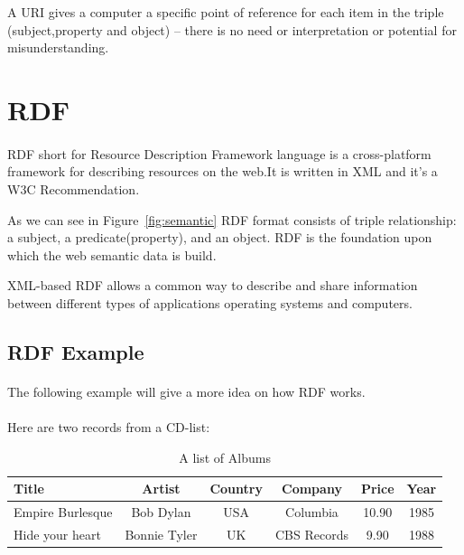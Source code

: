\documentclass[a4paper,11pt]{report}
\begin{document}
A URI gives a computer a specific point of reference for each item in the triple (subject,property and object) -- there is no need or interpretation or potential for misunderstanding.\\

\section{RDF}
\paragraph{}
RDF short for Resource Description Framework language is a  {\color{red}cross-platform framework} for describing resources on the web.It is written in XML and it's a W3C Recommendation.

As we can see in  Figure~\ref{fig:semantic}  RDF format consists of triple relationship: a subject, a predicate(property), and an object. RDF is the foundation upon which the web semantic data is build.

XML-based RDF allows a common way to describe and share information between different types of applications operating systems and computers.
 

\subsection{RDF Example}
\paragraph{}
The following example will give a more idea on how RDF works. \cite{w3schools}
 \paragraph{}
Here are two records from a CD-list:
 
\begin{table}[h]
\centering
\begin{tabular}{ | l | c | c | c | c | c |}
 \hline
 Title & Artist & Country & Company & Price & Year \\ \hline
 Empire Burlesque & Bob Dylan & USA &	Columbia & 10.90 &	1985 \\
 \hline
  Hide your heart & Bonnie Tyler & UK &	CBS Records &9.90 &	1988 \\
 \hline
\end{tabular}
\caption[A list of Albums]{A list of Albums}
\label{tab:albums}
\end{table}
\end{document}
